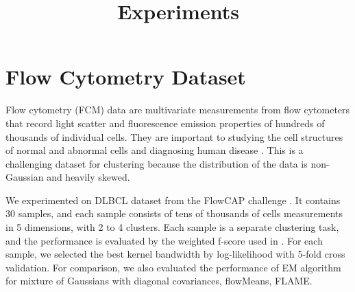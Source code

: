 \documentclass[11pt]{article}
\title{Experiments}
\begin{document}
\maketitle








\section{Flow Cytometry Dataset}
Flow cytometry (FCM) data are multivariate measurements from flow cytometers that record light scatter and fluorescence emission properties of hundreds of thousands of individual cells. They are important to studying the cell structures of normal and abnormal cells and diagnosing human disease \cite{cytometry_nature}. This is a challenging dataset for clustering because the distribution of the data is non-Gaussian and heavily skewed.

We experimented on DLBCL dataset from the FlowCAP challenge \cite{cytometry_nature}. It contains 30 samples, and each sample consists of tens of thousands of cells measurements in 5 dimensions, with 2 to 4 clusters. Each sample is a separate clustering task, and the performance is evaluated by the weighted f-score used in \cite{cytometry_nature}. For each sample, we selected the best kernel bandwidth by log-likelihood with 5-fold cross validation. For comparison, we also evaluated the performance of EM algorithm for mixture of Gaussians with diagonal covariances, flowMeans, FLAME.





\end{document}
